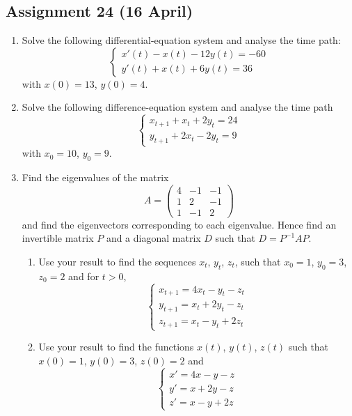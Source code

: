 \documentclass[a4paper]{article}
\begin{document}
\subsection*{Assignment 24 (16 April)}

\begin{enumerate}



\item Solve the following differential-equation system and analyse the time path:
\[
\begin{cases}
x'(t)-x(t)-12y(t)=-60 \\
y'(t)+x(t)+6y(t)=36
\end{cases}
\]
with $x(0)=13$, $y(0)=4$.

\item  Solve the following difference-equation system and analyse the time path
\[
\begin{cases}
x_{t+1}+x_t+2y_t=24 \\
y_{t+1}+2x_t-2y_t=9
\end{cases}
\]
 with $x_0=10$, $y_0=9$.

\item  Find the eigenvalues of the matrix 
\[
A=\begin{pmatrix}
4 & -1 & -1 \\ 
1 & 2 & -1 \\ 
1 & -1 & 2
\end{pmatrix} 
\]
and find the eigenvectors corresponding to each eigenvalue. Hence find an invertible matrix $P$  and a diagonal matrix $D$ such that $D=P^{-1}AP$. 

\begin{enumerate}
\item  Use your result to find the sequences $x_t$, $y_t$, $z_t$, such that $x_0=1$, $y_0=3$, $z_0=2$ and for $t>0$,
\[
\begin{cases}
x_{t+1}=4x_t-y_t-z_t \\
y_{t+1}=x_t+2y_t-z_t \\
z_{t+1}=x_t-y_t+2z_t
\end{cases}
\] 


\item Use your result to find the functions $x(t)$, $y(t)$, $z(t)$  such that  
$x(0)=1$, $y(0)=3$, $z(0)=2$ and 
\[
\begin{cases}
x'=4x-y-z \\
y'=x+2y-z \\
z'=x-y+2z
\end{cases}
\] 




\end{enumerate}
\end{enumerate}
\end{document}
